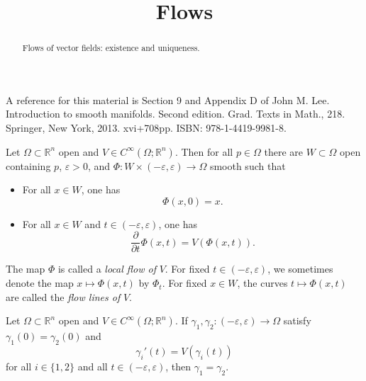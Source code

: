 \documentclass{ximera}
\title{Flows}
\begin{document}
    \begin{abstract} Flows of vector fields: existence and uniqueness. \end{abstract}
    \maketitle

   A reference for this material is Section 9 and Appendix D  of John M. Lee. Introduction to smooth manifolds. Second edition. Grad. Texts in Math., 218. Springer, New York, 2013. xvi+708pp. ISBN: 978-1-4419-9981-8.


    \begin{theorem}\label{thm:e-and-u}
        Let $\Omega \subset \mathbb{R}^n$ open and $V \in C^{\infty}(\Omega ; \mathbb{R}^n)$. Then for all $p \in \Omega$ there are $W \subset \Omega $ open containing $p$, $\varepsilon > 0 $, and $\Phi : W \times (- \varepsilon , \varepsilon ) \to \Omega$ smooth such that
        \begin{itemize}
            \item For all $x \in W$, one has 
            \[   \Phi (x,0) = x .    \]
            \item For all $x \in W$ and $t \in (- \varepsilon , \varepsilon )$, one has
            \[    \frac{\partial}{\partial t}  \Phi (x,t) = V\left(  \Phi (x,t)    \right) .    \]
        \end{itemize}
    \end{theorem}

    \begin{notation}
        The map $\Phi$ is called a \emph{local flow of} $V$. For fixed $t \in (- \varepsilon , \varepsilon) $, we sometimes denote the map $x \mapsto \Phi (x,t)$ by $\Phi_t$.          For fixed $x \in W$, the curves $t \mapsto \Phi (x,t)$ are called the \emph{flow lines of} $V$. 
    \end{notation}

    \begin{theorem}\label{thm:flow-line-uniqueness}
        Let $\Omega \subset \mathbb{R}^n$ open and $V \in C^{\infty}(\Omega ; \mathbb{R}^n)$. If $\gamma_1 , \gamma _2 : (-\varepsilon , \varepsilon ) \to \Omega$ satisfy $\gamma_1 (0) = \gamma _2 (0) $ and 
        \[   \gamma _i ' (t) = V(\gamma _i (t))     \]
        for all $ i \in \{ 1 , 2\}$  and all $t \in (- \varepsilon , \varepsilon ) $, then $\gamma _1 = \gamma_2$. 
    \end{theorem}
\end{document}
